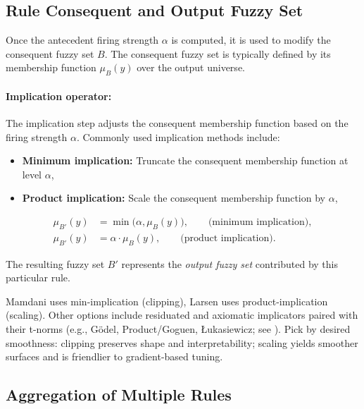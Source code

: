\subsection{Rule Consequent and Output Fuzzy Set}
\label{sec:fuzzyinference_rule_consequent_and_output_fuzzy_set}

Once the antecedent firing strength $\alpha$ is computed, it is used to modify the consequent fuzzy set $B$. The consequent fuzzy set is typically defined by its membership function $\mu_B(y)$ over the output universe.

\paragraph{Implication operator:} The implication step adjusts the consequent membership function based on the firing strength $\alpha$. Commonly used implication methods include:

\begin{itemize}
    \item \textbf{Minimum implication:} Truncate the consequent membership function at level $\alpha$,
    \item \textbf{Product implication:} Scale the consequent membership function by $\alpha$,
\end{itemize}
\begin{equation}
\begin{aligned}
\mu_{B'}(y) &= \min \big( \alpha, \mu_B(y) \big), \qquad \text{(minimum implication)},\\
\mu_{B'}(y) &= \alpha \cdot \mu_B(y), \qquad \text{(product implication)}.
\end{aligned}
\label{eq:implication_operators}
\end{equation}

The resulting fuzzy set $B'$ represents the \emph{output fuzzy set} contributed by this particular rule.
\begin{tcolorbox}[summarybox, title={Implication choices}]
Mamdani uses min-implication (clipping), Larsen uses product-implication (scaling). Other options include residuated and axiomatic implicators paired with their t\hyp{}norms (e.g., G\"odel, Product/Goguen, \L{}ukasiewicz; see \citealp{Klement2000, Dubois1988}). Pick by desired smoothness: clipping preserves shape and interpretability; scaling yields smoother surfaces and is friendlier to gradient-based tuning.
\end{tcolorbox}

\subsection{Aggregation of Multiple Rules}
\label{sec:fuzzyinference_aggregation_of_multiple_rules}

